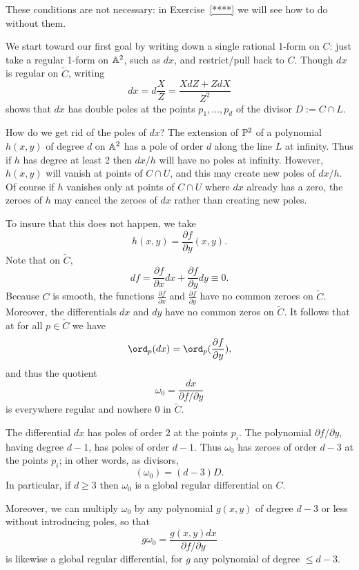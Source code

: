 These conditions are not necessary: in Exercise~\ref{****} we will see how to do  without them.
 
We start toward our first goal by writing down a single rational 1-form on $C$: just take a regular 1-form on $\AA^2$, such as $dx$, and restrict/pull back to $C$. Though $dx$ is regular on $\tilde C$, writing
$$
dx = d\frac{X}{Z} = \frac{X dZ+ Z dX}{Z^2}
$$
 shows that $dx$ has double poles at the points $p_1,\dots,p_d$ of the divisor $D := C \cap L$.
 
How do we get rid of the poles of $dx$? The extension of $\PP^2$ of a polynomial $h(x,y)$ of degree $d$ on
$\AA^2$ has a pole of order $d$ along the line $L$ at infinity. Thus if $h$ has degree at least 2 then $dx/h$ will have no poles at infinity. However, $h(x,y)$ will vanish at points of $C \cap U$, and this may create new poles of $dx/h$. Of course if $h$ vanishes only at  points of $C \cap U$ where $dx$ already has a zero, the zeroes of $h$ may cancel the zeroes of $dx$ rather than creating new poles.
 
 To insure that this does not happen, we take
 $$
 h(x,y) = \frac{\partial f}{\partial y}(x,y).
 $$
 Note that on $\tilde C$,
 $$
 df = \frac{\partial f}{\partial x}dx + \frac{\partial f}{\partial y}dy \equiv 0.
 $$
Because $C$ is smooth, the functions $\frac{\partial f}{\partial x}$ and $\frac{\partial f}{\partial y}$ have no common zeroes on $\tilde C$. Moreover, the differentials $dx$ and $dy$ have no common zeros on $\tilde C$. It follows that at for all $p \in \tilde C$ we  have
$$
\ord_p(dx) = \ord_p(\frac{\partial f}{\partial y}), 
$$ 
and thus the quotient 
$$
\omega_0 = \frac{dx}{\partial f/\partial y}
$$
is everywhere regular and nowhere 0 in $\tilde C$.

The differential $dx$ has poles of order $2$ at the points $p_i$. The polynomial $\partial f/\partial y$, having degree $d-1$, has poles of order $d-1$. Thus $\omega_0$ has zeroes of order $d-3$ at the points $p_i$; in other words, as divisors,
$$
(\omega_0) = (d-3)D.
$$
In particular, if $d \geq 3$ then $\omega_0$ is a global regular differential on $C$.

Moreover, we can  multiply $\omega_0$ by any polynomial $g(x,y)$ 
  of degree $d-3$ or less without introducing poles, so that 
$$
g\omega_0 = \frac{g(x,y)dx}{\partial f/\partial y}
$$ 
is likewise a global regular differential, for $g$  any polynomial of degree $\leq d-3$.

